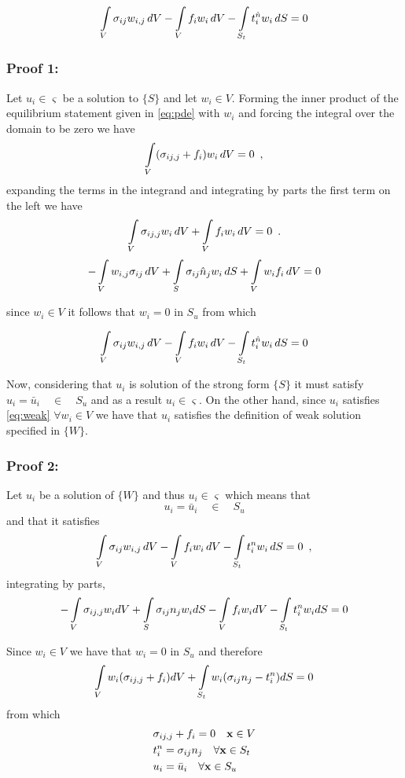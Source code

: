 \[\int\limits_V \sigma _{ij} w_{i,j}\, dV - \int\limits_V f_i w_i\, dV  - \int\limits_{S_t} t_i^{\hat n} w_i\, dS = 0\]

\subsubsection*{Proof 1:}
Let $u_i \in \varsigma $ be a solution to $\{S\}$ and let $w_i \in V $. Forming the inner product of the equilibrium statement given in \cref{eq:pde} with $w_i$ and forcing the integral over the domain to be zero we have
%
\[\int\limits_V (\sigma_{ij,j} + f_i ){w_i}\, dV = 0 \enspace ,\]
%
expanding the terms in the integrand and integrating by parts the first term on the left we have
%
\[\int\limits_V \sigma _{ij,j} w_i\, dV + \int\limits_V f_i w_i\, dV = 0 \enspace .\]
\[ - \int\limits_V w_{i,j} \sigma _{ij}\, dV  + \int\limits_S \sigma _{ij} \hat{n}_j w_i\, dS  + \int\limits\limits_V w_i f_i\, dV = 0 \]

since $w_i \in V$ it follows that $w_i = 0$ in $S_u$ from which

\begin{equation}\label{eq:weak}
\int\limits_V \sigma _{ij} w_{i,j}\, dV - \int\limits_V f_i w_i\, dV  - \int\limits_{S_t} t_i^{\hat n} w_i\, dS = 0
\end{equation}

Now, considering that $u_i$ is solution of the strong form $\{S\}$ it must satisfy $u_i = \bar u_{i} \quad \in \quad S_u$ and as a result $u_i \in \varsigma$. On the other hand, since $u_i$ satisfies \cref{eq:weak} $\forall {w_i} \in V$ we have that $u_i$ satisfies the definition of weak solution specified in $\{ W \}$.

\subsubsection*{Proof 2:}
Let $u_i$ be a solution of $\{W\}$ and thus $u_i \in \varsigma$ which means that
\[u_i = \bar u_{i} \quad \in \quad S_u\]
and that it satisfies
\[\int\limits_V \sigma _{ij} w_{i,j}\, dV - \int\limits_V f_i w_i\, dV - \int\limits_{S_t} t_i^n w_i\, dS = 0 \enspace ,\]
integrating by parts,
\[-\int\limits_V \sigma_{ij,j} w_idV + \int\limits_S \sigma_{ij} n_j w_i dS  - \int\limits_V f_i w_i dV - \int\limits_{S_t} {t_i^n} w_i dS = 0\]

Since ${w_i} \in V$ we have that ${w_i}=0$ in $S_u$ and therefore
\[\int\limits_V w_i(\sigma_{ij,j} + f_i)dV + \int\limits_{S_t} w_i( \sigma_{ij} n_j - t_i^n )dS = 0 \]
from which
\begin{equation} \label{equil_2}
\begin{split}
&\sigma_{ij,j} + f_i = 0 \quad \vb{x} \in V \\
&t_i^n = \sigma_{ij} n_j \quad \forall \vb{x} \in S_t\\
&{u_i} = \bar{u}_i \quad \forall \vb{x} \in S_u
\end{split}
\end{equation}

